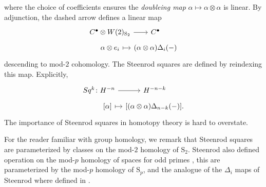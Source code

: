 where the choice of coefficients ensures the \textit{doubleing map} $\alpha \mapsto \alpha \otimes \alpha$ is linear.
By adjunction, the dashed arrow defines a linear map
\begin{equation} \label{e:Steenrod squares parameterized}
\begin{tikzcd}[row sep=tiny, column sep = tiny]
C^\bullet \otimes W(2)_{\mathrm S_2} \arrow[r] &[-10pt] C^\bullet \\
\alpha \otimes e_i \arrow[r, |->] & (\alpha \otimes \alpha)\Delta_i(-)
\end{tikzcd}
\end{equation}
descending to mod-$2$ cohomology. The Steenrod squares are defined by reindexing this map. Explicitly,
\begin{equation*}
\begin{tikzcd}[row sep=tiny, column sep=tiny]
Sq^k \colon H^{-n} \arrow[r] & H^{-n-k} \\
\phantom{Sq^k \colon}{[\alpha]} \arrow[r, |->] & {\left[(\alpha \otimes \alpha)\Delta_{n-k}(-) \right]}.
\end{tikzcd}
\end{equation*}
The importance of Steenrod squares in homotopy theory is hard to overstate.

\begin{remark}
	For the reader familiar with group homology, we remark that Steenrod squares are parameterized by classes on the mod-$2$ homology of $\mathrm S_2$.
	Steenrod also defined operation on the mod-$p$ homology of spaces for odd primes \cite{}, this are parameterized by the mod-$p$ homology of $\mathrm S_p$, and the analogue of the $\Delta_i$ maps of Steenrod where defined in \cite{medina2020odd}.
\end{remark}